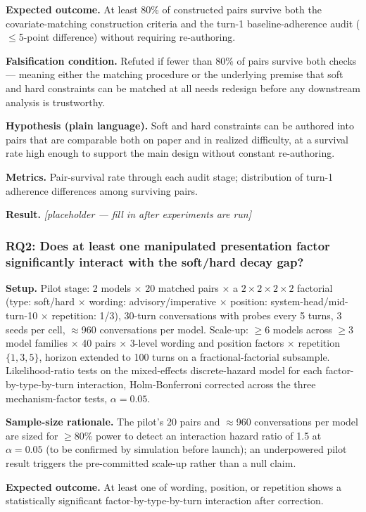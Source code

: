 \documentclass[11pt]{article}
\newcommand{\ph}{\textit{[placeholder --- fill in after experiments are run]}}
\begin{document}
\textbf{Expected outcome.} At least 80\% of constructed pairs survive both the covariate-matching construction criteria and the turn-1 baseline-adherence audit ($\leq$5-point difference) without requiring re-authoring.

\textbf{Falsification condition.} Refuted if fewer than 80\% of pairs survive both checks --- meaning either the matching procedure or the underlying premise that soft and hard constraints can be matched at all needs redesign before any downstream analysis is trustworthy.

\textbf{Hypothesis (plain language).} Soft and hard constraints can be authored into pairs that are comparable both on paper and in realized difficulty, at a survival rate high enough to support the main design without constant re-authoring.

\textbf{Metrics.} Pair-survival rate through each audit stage; distribution of turn-1 adherence differences among surviving pairs.

\textbf{Result.} \ph

\subsubsection{RQ2: Does at least one manipulated presentation factor significantly interact with the soft/hard decay gap?}
\textbf{Setup.} Pilot stage: 2 models $\times$ 20 matched pairs $\times$ a $2\times2\times2\times2$ factorial (type: soft/hard $\times$ wording: advisory/imperative $\times$ position: system-head/mid-turn-10 $\times$ repetition: 1/3), 30-turn conversations with probes every 5 turns, 3 seeds per cell, $\approx$960 conversations per model. Scale-up: $\geq$6 models across $\geq$3 model families $\times$ 40 pairs $\times$ 3-level wording and position factors $\times$ repetition $\{1, 3, 5\}$, horizon extended to 100 turns on a fractional-factorial subsample. Likelihood-ratio tests on the mixed-effects discrete-hazard model for each factor-by-type-by-turn interaction, Holm-Bonferroni corrected across the three mechanism-factor tests, $\alpha = 0.05$.

\textbf{Sample-size rationale.} The pilot's 20 pairs and $\approx$960 conversations per model are sized for $\geq$80\% power to detect an interaction hazard ratio of 1.5 at $\alpha = 0.05$ (to be confirmed by simulation before launch); an underpowered pilot result triggers the pre-committed scale-up rather than a null claim.

\textbf{Expected outcome.} At least one of wording, position, or repetition shows a statistically significant factor-by-type-by-turn interaction after correction.
\end{document}
